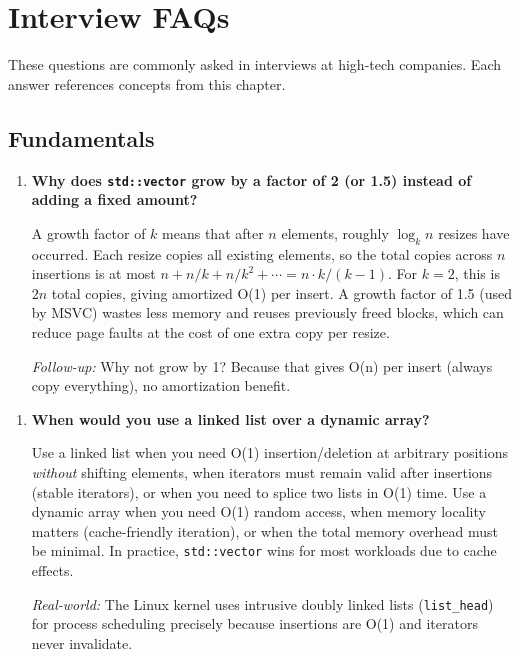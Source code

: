 \section{Interview FAQs}

These questions are commonly asked in interviews at high-tech companies. Each answer references concepts from this chapter.

\subsection{Fundamentals}

\begin{enumerate}
\item \textbf{Why does \texttt{std::vector} grow by a factor of 2 (or 1.5) instead of adding a fixed amount?}

A growth factor of $k$ means that after $n$ elements, roughly $\log_k n$ resizes have occurred. Each resize copies all existing elements, so the total copies across $n$ insertions is at most $n + n/k + n/k^{2} + \cdots = n \cdot k/(k-1)$. For $k=2$, this is $2n$ total copies, giving amortized O(1) per insert. A growth factor of 1.5 (used by MSVC) wastes less memory and reuses previously freed blocks, which can reduce page faults at the cost of one extra copy per resize.

\textit{Follow-up:} Why not grow by 1? Because that gives O(n) per insert (always copy everything), no amortization benefit.
\end{enumerate}

\begin{enumerate}
\item \textbf{When would you use a linked list over a dynamic array?}

Use a linked list when you need O(1) insertion/deletion at arbitrary positions \textit{without} shifting elements, when iterators must remain valid after insertions (stable iterators), or when you need to splice two lists in O(1) time. Use a dynamic array when you need O(1) random access, when memory locality matters (cache-friendly iteration), or when the total memory overhead must be minimal. In practice, \texttt{std::vector} wins for most workloads due to cache effects.

\textit{Real-world:} The Linux kernel uses intrusive doubly linked lists (\texttt{list\_head}) for process scheduling precisely because insertions are O(1) and iterators never invalidate.
\end{enumerate}

